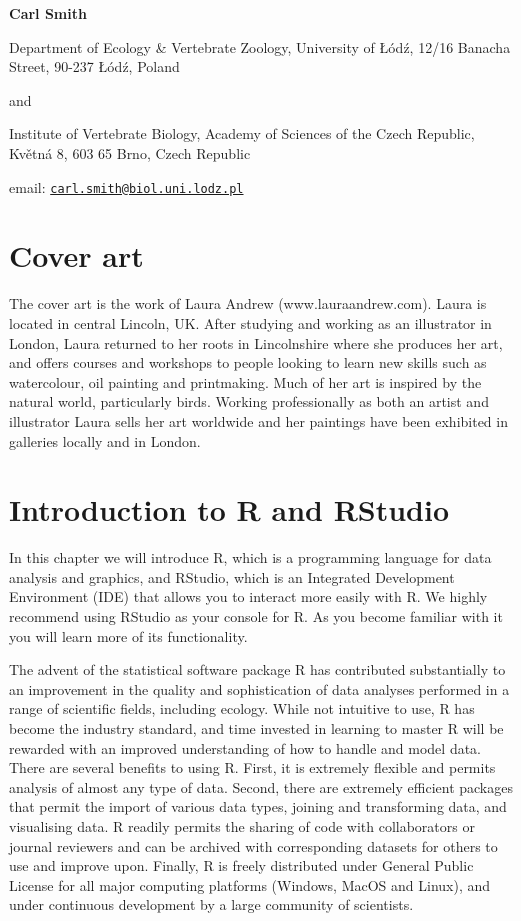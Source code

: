 \documentclass[
]{book}
\begin{document}
\textbf{Carl Smith}

Department of Ecology \& Vertebrate Zoology,
University of Łódź,
12/16 Banacha Street,
90-237 Łódź,
Poland

and

Institute of Vertebrate Biology,
Academy of Sciences of the Czech Republic,
Květná 8,
603 65 Brno,
Czech Republic

email: \href{mailto:carl.smith@biol.uni.lodz.pl}{\nolinkurl{carl.smith@biol.uni.lodz.pl}}

\hypertarget{cover-art}{%
\chapter*{Cover art}\label{cover-art}}

The cover art is the work of Laura Andrew (www.lauraandrew.com). Laura is located in central Lincoln, UK. After studying and working as an illustrator in London, Laura returned to her roots in Lincolnshire where she produces her art, and offers courses and workshops to people looking to learn new skills such as watercolour, oil painting and printmaking. Much of her art is inspired by the natural world, particularly birds. Working professionally as both an artist and illustrator Laura sells her art worldwide and her paintings have been exhibited in galleries locally and in London.

\hypertarget{intro1}{%
\chapter{Introduction to R and RStudio}\label{intro1}}

In this chapter we will introduce R, which is a programming language for data analysis and graphics, and RStudio, which is an Integrated Development Environment (IDE) that allows you to interact more easily with R. We highly recommend using RStudio as your console for R. As you become familiar with it you will learn more of its functionality.

The advent of the statistical software package R has contributed substantially to an improvement in the quality and sophistication of data analyses performed in a range of scientific fields, including ecology. While not intuitive to use, R has become the industry standard, and time invested in learning to master R will be rewarded with an improved understanding of how to handle and model data. There are several benefits to using R. First, it is extremely flexible and permits analysis of almost any type of data. Second, there are extremely efficient packages that permit the import of various data types, joining and transforming data, and visualising data. R readily permits the sharing of code with collaborators or journal reviewers and can be archived with corresponding datasets for others to use and improve upon. Finally, R is freely distributed under General Public License for all major computing platforms (Windows, MacOS and Linux), and under continuous development by a large community of scientists.
\end{document}
